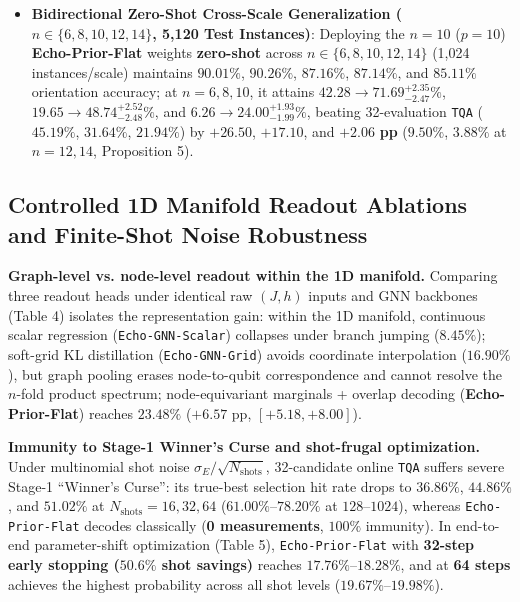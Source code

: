 \documentclass{article}
\theoremstyle{plain}
\theoremstyle{definition}
\begin{document}
\begin{itemize}
\item \textbf{Bidirectional Zero-Shot Cross-Scale Generalization ($n\in\{6,8,10,12,14\}$, 5,120 Test Instances)}: Deploying the $n=10$ ($p=10$) \textbf{Echo-Prior-Flat} weights \textbf{zero-shot} across $n\in\{6,8,10,12,14\}$ (1,024 instances/scale) maintains $\mathbf{90.01}\%$, $\mathbf{90.26}\%$, $\mathbf{87.16}\%$, $\mathbf{87.14}\%$, and $\mathbf{85.11}\%$ orientation accuracy; at $n=6,8,10$, it attains $42.28\rightarrow\allowbreak \mathbf{71.69}^{+2.35}_{-2.47}\%$, $19.65\rightarrow\allowbreak \mathbf{48.74}^{+2.52}_{-2.48}\%$, and $6.26\rightarrow\allowbreak \mathbf{24.00}^{+1.93}_{-1.99}\%$, beating 32-evaluation \texttt{TQA} ($45.19\%$, $31.64\%$, $21.94\%$) by $\mathbf{+26.50}$, $\mathbf{+17.10}$, and $\mathbf{+2.06}$ \textbf{pp} ($9.50\%$, $3.88\%$ at $n=12, 14$, Proposition 5).

\end{itemize}
\subsection{Controlled 1D Manifold Readout Ablations and Finite-Shot Noise Robustness}\label{subsec:5_4}



\textbf{Graph-level vs. node-level readout within the 1D manifold.} Comparing three readout heads under identical raw $(J,h)$ inputs and GNN backbones (Table 4) isolates the representation gain: within the 1D manifold, continuous scalar regression (\texttt{Echo-GNN-Scalar}) collapses under branch jumping ($8.45\%$); soft-grid KL distillation (\texttt{Echo-GNN-Grid}) avoids coordinate interpolation ($16.90\%$), but graph pooling erases node-to-qubit correspondence and cannot resolve the $n$-fold product spectrum; node-equivariant marginals + overlap decoding (\textbf{Echo-Prior-Flat}) reaches \textbf{$\mathbf{23.48}\%$} ($+6.57$ pp, $[+5.18, +8.00]$).

\textbf{Immunity to Stage-1 Winner's Curse and shot-frugal optimization.} Under multinomial shot noise $\sigma_E/\sqrt{N_{\mathrm{shots}}}$, 32-candidate online \texttt{TQA} suffers severe Stage-1 ``Winner's Curse'': its true-best selection hit rate drops to $\mathbf{36.86}\%$, $\mathbf{44.86}\%$, and $\mathbf{51.02}\%$ at $N_{\mathrm{shots}}=16, 32, 64$ ($61.00\%\text{--}78.20\%$ at $128\text{--}1024$), whereas \texttt{Echo-Prior-Flat} decodes classically (\textbf{0 measurements}, \textbf{$100\%$} immunity). In end-to-end parameter-shift optimization (Table 5), \texttt{Echo-Prior-Flat} with \textbf{32-step early stopping ($50.6\%$ shot savings)} reaches $17.76\%\text{--}18.28\%$, and at \textbf{64 steps} achieves the highest probability across all shot levels (\textbf{$\mathbf{19.67}\%\text{--}\mathbf{19.98}\%$}).
\end{document}
